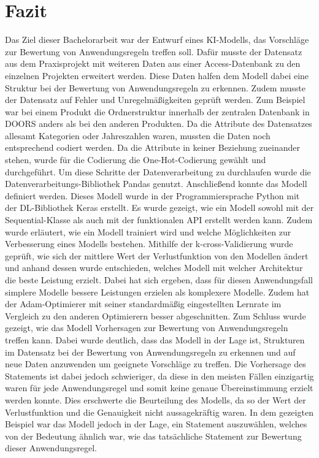 \chapter{Fazit}
\label{chap:Fazit}
Das Ziel dieser Bachelorarbeit war der Entwurf eines \ac{KI}-Modells, das Vorschläge zur Bewertung von Anwendungsregeln treffen soll.
Dafür musste der Datensatz aus dem Praxisprojekt mit weiteren Daten aus einer Access-Datenbank zu den einzelnen Projekten erweitert werden.
Diese Daten halfen dem Modell dabei eine Struktur bei der Bewertung von Anwendungsregeln zu erkennen. Zudem musste
der Datensatz auf Fehler und Unregelmäßigkeiten geprüft werden. Zum Beispiel war bei einem Produkt die Ordnerstruktur innerhalb der zentralen Datenbank in 
\ac{DOORS} anders als bei den anderen Produkten. Da die Attribute des Datensatzes allesamt Kategorien oder Jahreszahlen waren, mussten die Daten noch entsprechend codiert werden.
Da die Attribute in keiner Beziehung zueinander stehen, wurde für die Codierung die One-Hot-Codierung gewählt und durchgeführt. 
Um diese Schritte der Datenverarbeitung zu durchlaufen wurde die Datenverarbeitungs-Bibliothek Pandas genutzt. Anschließend konnte das Modell definiert werden. Dieses Modell wurde
in der Programmiersprache Python mit der \ac{DL}-Bibliothek Keras erstellt. Es wurde gezeigt, wie ein Modell sowohl mit der \glqq Sequential\grqq{}-Klasse
als auch mit der funktionalen \ac{API} erstellt werden kann. Zudem wurde erläutert, wie ein Modell trainiert wird und welche Möglichkeiten zur Verbesserung eines 
Modells bestehen. Mithilfe der k-cross-Validierung wurde geprüft, wie sich der mittlere Wert der Verlustfunktion von den Modellen ändert und anhand dessen 
wurde entschieden, welches Modell mit welcher Architektur die beste Leistung erzielt. Dabei hat sich ergeben, dass für diesen Anwendungsfall 
simplere Modelle bessere Leistungen erzielen als komplexere Modelle. Zudem hat der Adam-Optimierer mit seiner standardmäßig eingestellten Lernrate im Vergleich zu den anderen Optimierern
besser abgeschnitten. Zum Schluss wurde gezeigt, wie das Modell Vorhersagen zur Bewertung von Anwendungsregeln treffen kann. Dabei wurde deutlich, dass das Modell in der Lage ist, 
Strukturen im Datensatz bei der Bewertung von Anwendungsregeln zu erkennen und auf neue Daten anzuwenden um geeignete Vorschläge zu treffen. Die Vorhersage des Statements ist dabei jedoch 
schwieriger, da diese in den meisten Fällen einzigartig waren für jede Anwendungsregel und somit keine genaue Übereinstimmung erzielt werden konnte. Dies erschwerte die Beurteilung des Modells,
da so der Wert der Verlustfunktion und die Genauigkeit nicht aussagekräftig waren. In dem gezeigten Beispiel war das Modell jedoch in der Lage, ein Statement auszuwählen, 
welches von der Bedeutung ähnlich war, wie das tatsächliche Statement zur Bewertung dieser Anwendungsregel. 

